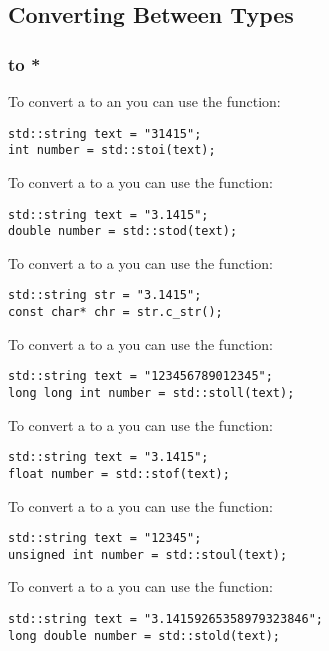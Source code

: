 \subsection{Converting Between Types}

\subsubsection{ to *}

To convert a  to an  you can use the  function:
\begin{lstlisting}
std::string text = "31415";
int number = std::stoi(text);
\end{lstlisting}

To convert a  to a  you can use the  function:
\begin{lstlisting}
std::string text = "3.1415";
double number = std::stod(text);
\end{lstlisting}

To convert a  to a  you can use the  function:
\begin{lstlisting}
std::string str = "3.1415";
const char* chr = str.c_str();
\end{lstlisting}

To convert a  to a  you can use the  function:
\begin{lstlisting}
std::string text = "123456789012345";
long long int number = std::stoll(text);
\end{lstlisting}

To convert a  to a  you can use the  function:
\begin{lstlisting}
std::string text = "3.1415";
float number = std::stof(text);
\end{lstlisting}

To convert a  to a  you can use the  function:
\begin{lstlisting}
std::string text = "12345";
unsigned int number = std::stoul(text);
\end{lstlisting}

To convert a  to a  you can use the  function:
\begin{lstlisting}
std::string text = "3.14159265358979323846";
long double number = std::stold(text);
\end{lstlisting}










